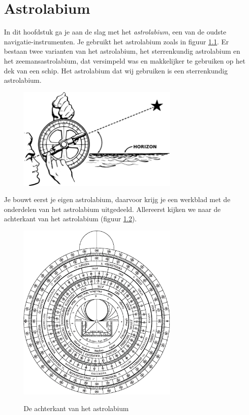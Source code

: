 \chapter{Astrolabium}

In dit hoofdstuk ga je aan de slag met het \textit{astrolabium}, een van de oudste navigatie-instrumenten. Je gebruikt het astrolabium zoals in figuur \ref{astrolabe-face}. Er bestaan twee varianten van het astrolabium, het sterrenkundig astrolabium en het zeemansastrolabium, dat versimpeld was en makkelijker te gebruiken op het dek van een schip. Het astrolabium dat wij gebruiken is een sterrenkundig astrolabium.

\begin{figure}
\centering
 \includegraphics[width=0.7\textwidth]{astrolabe-hi.png}
 \label{astrolabe-face}
\end{figure}

Je bouwt eerst je eigen astrolabium, daarvoor krijg je een werkblad met de onderdelen van het astrolabium uitgedeeld. Allereerst kijken we naar de achterkant van het astrolabium (figuur \ref{astrolabe-back}).

\begin{figure}
\centering
 \includegraphics[width=0.7\textwidth]{astrolabiumNL/mother_back.eps}
 \label{astrolabe-back}
 \caption{De achterkant van het astrolabium}
\end{figure}

